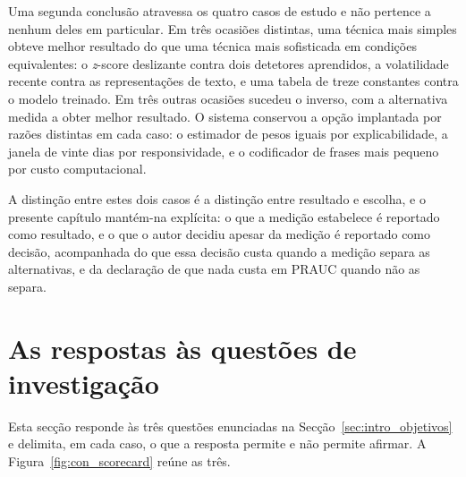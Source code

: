 Uma segunda conclusão atravessa os quatro casos de estudo e não pertence a nenhum deles em
particular. Em três ocasiões distintas, uma técnica mais simples obteve melhor resultado do que uma
técnica mais sofisticada em condições equivalentes: o \emph{z}-score deslizante contra dois
detetores aprendidos, a volatilidade recente contra as representações de texto, e uma tabela de
treze constantes contra o modelo treinado. Em três outras ocasiões sucedeu o inverso, com a alternativa medida a obter melhor resultado. O
sistema conservou a opção implantada por razões distintas em cada caso: o estimador de pesos
iguais por explicabilidade, a janela de vinte dias por responsividade, e o codificador de frases
mais pequeno por custo computacional.

A distinção entre estes dois casos é a distinção entre resultado e escolha, e o
presente capítulo mantém-na explícita: o que a medição estabelece é reportado como resultado, e o
que o autor decidiu apesar da medição é reportado como decisão, acompanhada do que essa decisão
custa quando a medição separa as alternativas, e da declaração de que nada custa em \gls{PRAUC}
quando não as separa.

\section{As respostas às questões de investigação}
\label{sec:con_respostas}

Esta secção responde às três questões enunciadas na Secção~\ref{sec:intro_objetivos} e delimita, em
cada caso, o que a resposta permite e não permite afirmar. A Figura~\ref{fig:con_scorecard} reúne as
três.

